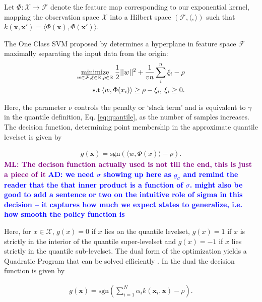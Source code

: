 \documentclass[10pt, conference]{ieeeconf}      %
\newcommand{\bx}{\mathbf{x}}
\newcommand{\adnote}[1]{\ifthenelse{\boolean{include-notes}}%
 {\textcolor{blue}{\textbf{AD: #1}}}{}}
\newcommand{\mlnote}[1]{\ifthenelse{\boolean{include-notes}}%
 {\textcolor{purple}{\textbf{ML: #1}}}{}}
\begin{document}
Let $\Phi:\mathcal{X}\to \mathcal{F}$ denote the feature map corresponding to our exponential kernel, mapping the
observation space $\mathcal{X}$ into a Hilbert space $(\mathcal{F}, \langle, \rangle)$ such that $k(\bx, \bx') = \langle
\Phi(\bx), \Phi(\bx')\rangle$.

The One Class SVM proposed by \cite{scholkopf2001estimating} determines a hyperplane in feature space $\mathcal{F}$
maximally separating the input data from the origin:
\vspace{-2ex}
\begin{align}\label{eq:primal_sup}
    \underset{w\in \mathcal{F}, \mathbf{\xi} \in \mathbb{R}, \rho \in \mathbb{R}}{\mbox{minimize}}\: \frac{1}{2}||w||^2+\frac{1}{vn} \sum^n_i \xi_i - \rho\\
\mbox{s.t} \: \langle w,\Phi(x_i) \rangle \geq \rho - \xi_i, \: \xi_i \geq 0 \notag.
\end{align}

Here, the parameter $\nu$ controls the penalty or `slack term' and is equivalent to $\gamma$ \cite{vert2006consistency}
in the quantile definition, Eq. \ref{eq:quantile}, as the number of samples increases. The decision
function, determining point membership in the approximate quantile levelset is given by

\vspace{-2ex}
\begin{align}\label{eq:decision_func}
g(\bx) = \mbox{sgn}(\langle w,\Phi(x) \rangle-\rho).
\end{align}
\mlnote{The decison function actually used is not till the end, this is just a piece of it}
\adnote{we need $\sigma$ showing up here as $g_{\sigma}$ and remind the reader that the that inner product is a function of $\sigma$. might also be good to add a sentence or two on the intuitive role of sigma in this decision -- it captures how much we expect states to generalize, i.e. how smooth the policy function is}

Here, for $x\in \mathcal{X}$, $g(x)=0$ if $x$ lies on the quantile levelset,
$g(x) = 1$ if $x$ is strictly in the interior of the quantile super-levelset and $g(x) = -1$ 
if $x$ lies strictly in the quantile sub-levelset. The dual form of the optimization yields a Quadratic Program 
that can be solved efficiently \cite{scholkopf2001estimating}. In the dual the decision function is given by 

\vspace{-2ex}
\begin{align}
g(\bx) = \mbox{sgn}(\sum^N_{i=1}\alpha_i k(\bx_i,\bx)-\rho).
\end{align}
\end{document}
